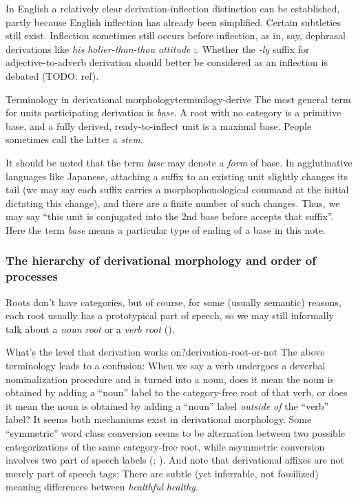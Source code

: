 \documentclass[UTF8, a4paper, oneside, scheme=plain]{ctexrep}
\newcommand*{\citepage}[1]{p.~{#1}}
\newcommand*{\term}[1]{\emph{#1}}
\newcommand{\corpus}[1]{\emph{#1}}
\begin{document}
In English a relatively clear derivation-inflection distinction can be established,
partly because English inflection has already been simplified.
Certain subtleties still exist.
Inflection sometimes still occurs before inflection,
as in, say, dephrasal derivations like \corpus{his holier-than-thou attitude} \citep[\citepage{1646}]{cgel};.
Whether the \corpus{-ly} suffix for adjective-to-adverb derivation 
should better be considered as an inflection is debated (TODO: ref).

\begin{infobox}{Terminology in derivational morphology}{terminilogy-derive}
    The most general term for units participating derivation is \term{base}.
    A root with no category is a primitive base,
    and a fully derived, ready-to-inflect unit is a maximal base.
    People sometimes call the latter a \term{stem}.

    It should be noted that the term \term{base} may denote a \emph{form} of base.
    In agglutinative languages like Japanese,
    attaching a suffix to an existing unit slightly changes its tail
    (we may say each suffix carries a morphophonological command at the initial
    dictating this change),
    and there are a finite number of such changes.
    Thus, we may say ``this unit is conjugated into the 2nd base before accepts that suffix''.
    Here the term \term{base} means a particular type of ending 
    of a base in this note.
\end{infobox}

\subsubsection{The hierarchy of derivational morphology and order of processes}

Roots don't have categories,
but of course, for some (usually semantic) reasons,
each root usually has a prototypical part of speech,
so we may still informally talk about a \term{noun root} or a \term{verb root} 
().

\begin{infobox}{What's the level that derivation works on?}{derivation-root-or-not}
    The above terminology leads to a confusion:
    When we say a verb undergoes a deverbal nominalization procedure
    and is turned into a noun,
    does it mean the noun is obtained by 
    adding a ``noun'' label to the category-free root of that verb,
    or does it mean the noun is obtained by adding a ``noun'' label 
    \emph{outside of} the ``verb'' label?
    It seems both mechanisms exist in derivational morphology.
    Some ``symmetric'' word class conversion seems to be 
    alternation between two possible categorizations of the same category-free root,
    while asymmetric conversion involves two part of speech labels 
    (\citealt[\citepage{1641}]{cgel}; \citealt[\citepage{62}, (15)]{siddiqi2009syntax}).
    And note that derivational affixes are not merely part of speech tags:
    There are subtle (yet inferrable, not fossilized) meaning differences between 
    \corpus{healthful} \corpus{healthy}.
\end{infobox}
\end{document}
